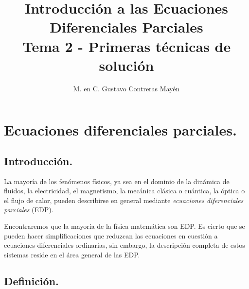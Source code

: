 
\title{Introducción a las Ecuaciones Diferenciales Parciales \\[0.3em]  \large{Tema 2 - Primeras técnicas de solución} \vspace{-3ex}}
\author{M. en C. Gustavo Contreras Mayén}
\date{ }

\pagestyle{fancy}
\fancyhf{}
\lhead{\leftmark}
\rfoot{\thepage}
\setlength{\headheight}{16pt}%


\vspace{-4cm}
\maketitle
\fontsize{14}{14}\selectfont
\tableofcontents
\newpage

\section{Ecuaciones diferenciales parciales.}

\subsection{Introducción.}

La mayoría de los fenómenos físicos, ya sea en el dominio de la dinámica de fluidos, la electricidad, el magnetismo, la mecánica clásica o cuántica, la óptica o el flujo de calor, pueden describirse en general mediante \emph{ecuaciones diferenciales parciales} (EDP).
\par
Encontraremos que la mayoría de la física matemática son EDP. Es cierto que se pueden hacer simplificaciones que reduzcan las ecuaciones en cuestión a ecuaciones diferenciales ordinarias, sin embargo, la descripción completa de estos sistemas reside en el área general de las EDP.

\subsection*{Definición.}

